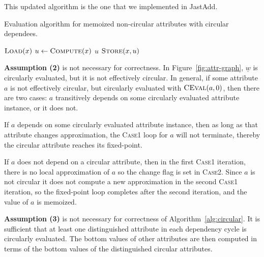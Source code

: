 {This updated algorithm is the one that we implemented in JastAdd.


\begin{algorithm}
  \caption{Evaluation algorithm for memoized non-circular attributes with circular dependees.}
  \label{alg:eval-circ-safe}
  \begin{algorithmic}
      \State \Return $\textsc{Load}(x)$
    \Else
      \State $u \leftarrow \textsc{Compute}(x)$
        \State \Return $u$
      \Else
        \State \Return $\textsc{Store}(x, u)$
      \EndIf
    \EndIf
  \EndProcedure
  \end{algorithmic}
\end{algorithm}


\textbf{Assumption (2)} is not necessary for correctness. In Figure~\ref{fig:attr-graph}, $\underline{w}$ is circularly evaluated, but it is not effectively circular. In general, 
if some attribute $a$ is not effectively circular,
but circularly evaluated with $\textsc{CEval}(a, 0)$, then there are two cases: $a$ transitively depends
on some circularly evaluated attribute instance, or it does not.

If $a$ depends on some circularly evaluated attribute instance, then
as long as that attribute changes approximation, the \textsc{Case1} loop for $a$ will not terminate,
thereby the circular attribute reaches its fixed-point.

If $a$ does not depend on a circular attribute, then in the first \textsc{Case1} iteration,
there is no local approximation of $a$ so the change flag is set in \textsc{Case2}.
Since $a$ is not circular it does not compute a new approximation in the second \textsc{Case1}
iteration, so the fixed-point loop completes after the second iteration,
and the value of $a$ is memoized.

\textbf{Assumption (3)} is not necessary for correctness of Algorithm~\ref{alg:circular}. 
It is
sufficient that at least one distinguished attribute in each dependency cycle is circularly
evaluated.
The bottom values of other attributes are then
computed in terms of the bottom values of the distinguished circular attributes.

}
